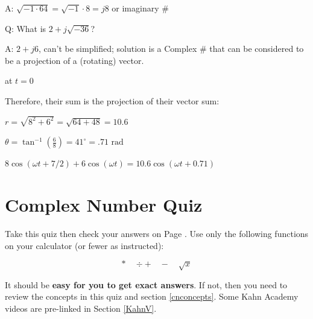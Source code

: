A: $\sqrt{-1 \cdot 64} = \sqrt{-1} \cdot 8 = j8$ or imaginary \#

Q: What is $2 + j\sqrt{-36}$?

A: $2 + j6$, can't be simplified; solution is
a Complex \# that can be considered to
be a projection of a (rotating) vector.

\noindent at $t=0$


Therefore, their sum is the projection of their vector
sum:

$r = \sqrt{8^2 + 6^2} = \sqrt{64 + 48} = 10.6$

$\theta = \tan^{-1}\left(\frac{6}{8}\right) = 41^\circ = .71 \text{ rad}$

$8\cos(\omega t + 7/2) + 6\cos(\omega t) = 10.6\cos(\omega t + 0.71)$


\clearpage
\newpage
\section{Complex Number Quiz}\label{ComplexNumberQuiz}
Take this quiz then check your answers on Page \pageref{CN_answers}.  Use only the following functions on your calculator (or fewer as instructed):

\[
* \quad \div + \quad - \quad \sqrt{x}
\]


It should be {\bf easy for you to get exact answers}.  If not, then you need to review the concepts in this quiz and section \ref{cnconcepts}.   Some Kahn Academy videos are pre-linked in Section \ref{KahnV}.


